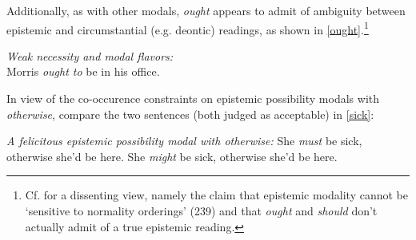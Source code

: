 Additionally, as with other modals, \textit{ought} appears to admit of ambiguity between epistemic and circumstantial (e.g. deontic) readings, as shown in \ref{ought}.\footnote{Cf. \citet{Yalcin2016} for a dissenting view, namely the claim that epistemic modality cannot be `sensitive to normality orderings' (239) and that \textit{ought} and \textit{should} don't actually admit of a true epistemic reading.}

\pex \label{ought} \textit{Weak necessity and modal flavors:}\\
Morris \textit{ought to} be in his office.\hfill\citep[116]{VonFintel2008}\xe


In view of the co-occurence constraints on epistemic possibility modals with \textit{otherwise}, compare the two sentences (both judged as acceptable) in \ref{sick}: %


\pex \label{sick} \textit{A felicitous epistemic possibility modal with \emph{otherwise}:}
\a  She \textit{must} be sick, otherwise she'd be here. \label{sick-must}%
\a  She \textit{might} be sick, otherwise she'd be here. \label{sick-might}\xe

